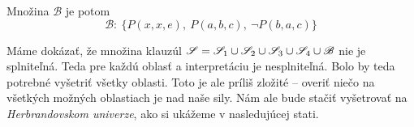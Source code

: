 \begin{priklad}
    Množina $\mathscr{B}$ je potom
    \begin{equation*}
        \mathscr{B}:\  \Big\{P(x,x,e),\ P(a,b,c),\ \neg P(b,a,c) \Big\}
    \end{equation*}

    Máme dokázať, že množina klauzúl 
    $\mathscr{S} = \mathscr{S}_1 \cup \mathscr{S}_2 \cup
        \mathscr{S}_3 \cup \mathscr{S}_4 \cup \mathscr{B}$
    nie je splniteľná. Teda pre každú oblasť a interpretáciu je
    nesplniteľná.
    Bolo by teda potrebné vyšetriť všetky oblasti.
    Toto je ale príliš zložité -- overiť niečo na všetkých možných
    oblastiach je nad naše sily.
    Nám ale bude stačiť vyšetrovať na \emph{Herbrandovskom univerze},
    ako si ukážeme v nasledujúcej stati.
\end{priklad}
